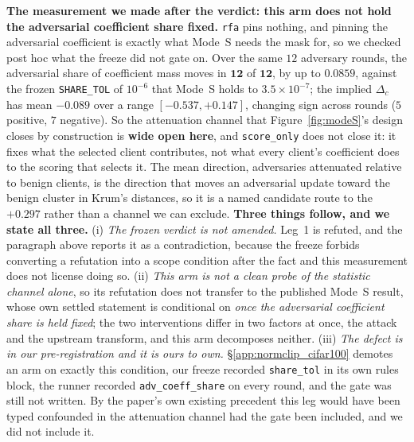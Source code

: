 \documentclass{article}
\begin{document}
\textbf{The measurement we made after the verdict: this arm does not hold the adversarial coefficient share fixed.} \texttt{rfa} pins nothing, and pinning the adversarial coefficient is exactly what Mode~S needs the mask for, so we checked post hoc what the freeze did not gate on. Over the same $12$ adversary rounds, the adversarial share of coefficient mass moves in $\mathbf{12}$ of $\mathbf{12}$, by up to $0.0859$, against the frozen \texttt{SHARE\_TOL} of $10^{-6}$ that Mode~S holds to $3.5{\times}10^{-7}$; the implied $\Delta_c$ has mean $-0.089$ over a range $[-0.537,+0.147]$, changing sign across rounds ($5$ positive, $7$ negative). So the attenuation channel that Figure~\ref{fig:modeS}'s design closes by construction is \textbf{wide open here}, and \texttt{score\_only} does not close it: it fixes what the selected client contributes, not what every client's coefficient does to the scoring that selects it. The mean direction, adversaries attenuated relative to benign clients, is the direction that moves an adversarial update toward the benign cluster in Krum's distances, so it is a named candidate route to the $+0.297$ rather than a channel we can exclude. \textbf{Three things follow, and we state all three.} (i) \emph{The frozen verdict is not amended.} Leg~1 is refuted, and the paragraph above reports it as a contradiction, because the freeze forbids converting a refutation into a scope condition after the fact and this measurement does not license doing so. (ii) \emph{This arm is not a clean probe of the statistic channel alone}, so its refutation does not transfer to the published Mode~S result, whose own settled statement is conditional on \emph{once the adversarial coefficient share is held fixed}; the two interventions differ in two factors at once, the attack and the upstream transform, and this arm decomposes neither. (iii) \emph{The defect is in our pre-registration and it is ours to own.} §\ref{app:normclip_cifar100} demotes an arm on exactly this condition, our freeze recorded \texttt{share\_tol} in its own rules block, the runner recorded \texttt{adv\_coeff\_share} on every round, and the gate was still not written. By the paper's own existing precedent this leg would have been typed confounded in the attenuation channel had the gate been included, and we did not include it.
\end{document}
